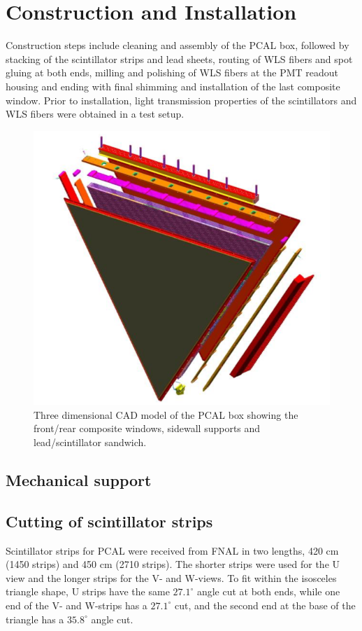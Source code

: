 \section{Construction and Installation}
Construction steps include cleaning and assembly of the PCAL box, followed by stacking of the scintillator strips and lead sheets, routing of WLS fibers and spot gluing at both ends, milling and polishing of WLS fibers at the PMT readout housing and ending with final shimming and installation of the last composite window. Prior to installation, light transmission properties of the scintillators and WLS fibers were obtained in a test setup. 
\begin{figure}[hbt]
\centering
\includegraphics[width=0.95\columnwidth,keepaspectratio]{img/S5_1.png}
\caption{Three dimensional CAD model of the PCAL box showing the front/rear composite windows, sidewall supports and lead/scintillator sandwich.}
\label{fig:S5_1}
\end{figure}

\subsection{Mechanical support}

\subsection{Cutting of scintillator strips}
Scintillator strips for PCAL were received from FNAL in two lengths, 420 cm (1450 strips) and 450 cm (2710 strips). The shorter strips were used for the U view and the longer strips for the V- and W-views. To fit within the isosceles triangle shape, U strips have the same $27.1^\circ$ angle cut at both ends, while one end of the V- and W-strips has a $27.1^\circ$ cut, and the second end at the base of the triangle has a $35.8^\circ$ angle cut.

